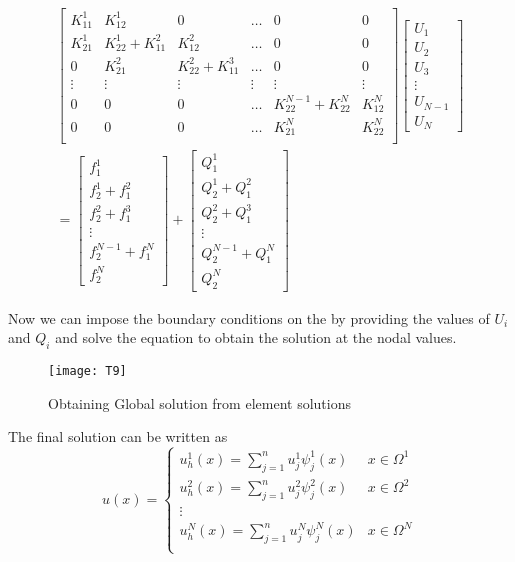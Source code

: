 \begin{eqnarray*}
\begin{bmatrix}
		K_{11}^1 & K_{12}^1 & 0 & \dots & 0 & 0 \\
		K_{21}^1 & K_{22}^1 + K_{11}^2 & K_{12}^2 & \dots & 0 & 0 \\
		0 & K_{21}^2 & K_{22}^2 + K_{11}^3 & \dots& 0 & 0 \\
		\vdots & \vdots & \vdots & \vdots & \vdots & \vdots \\
		0 &0 & 0 & \dots & K_{22}^{N-1} + K_{22}^N & K_{12}^N \\
		0 & 0 & 0 & \dots & K_{21}^N & K_{22}^N \\
\end{bmatrix}
\begin{bmatrix}
	U_1 \\
	U_2 \\
	U_3 \\
	\vdots \\
	U_{N-1} \\
	U_N
\end{bmatrix}\\=
\begin{bmatrix}
	f_1^1 \\
	f_2^1 + f_1^2\\
	f_2^2 + f_1^3\\
	\vdots \\
	f_2^{N-1} + f_1^N \\
	f_2^N
\end{bmatrix} +
\begin{bmatrix}
	Q_1^1 \\
	Q_2^1 + Q_1^2\\
	Q_2^2 + Q_1^3\\
	\vdots \\
	Q_2^{N-1} + Q_1^N \\
	Q_2^N
\end{bmatrix} 
\end{eqnarray*}

Now we can impose the boundary conditions on the by providing the values of $U_i$ and $Q_i$ and solve the equation to obtain the solution at the nodal values.
    \begin{figure}[h!]
	\centering
	\texttt{[image: T9]}
	\caption{Obtaining Global solution from element solutions}
\end{figure}
The final solution can be written as
\[ u(x) = \begin{cases} 
	u_h^1(x) = \sum_{j=1}^{n} u_j^1 \psi_j^1(x)& x \in \Omega^1 \\
	u_h^2(x) = \sum_{j=1}^{n} u_j^2 \psi_j^2(x)& x \in \Omega^2 \\
	\vdots\\
	u_h^N(x) = \sum_{j=1}^{n} u_j^N \psi_j^N(x)& x \in \Omega^N \\
\end{cases}
\]


